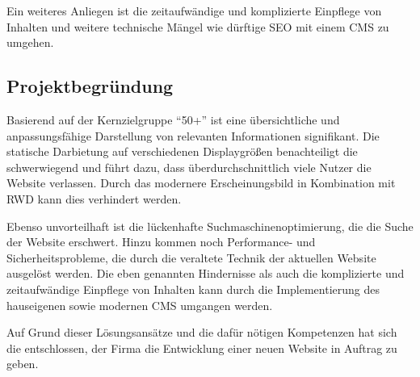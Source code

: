 Ein weiteres Anliegen ist die zeitaufwändige und komplizierte Einpflege von
Inhalten und weitere technische Mängel wie \zB dürftige \ac{SEO} mit einem
\ac{CMS} zu umgehen.


\subsection{Projektbegründung} 
\label{sec:Projektbegruendung}
Basierend auf der Kernzielgruppe "`50+"' ist eine übersichtliche und
anpassungsfähige Darstellung von relevanten Informationen signifikant. 
Die statische Darbietung auf verschiedenen Displaygrößen benachteiligt die
 schwerwiegend und führt dazu, dass
überdurchschnittlich viele Nutzer die Website verlassen. Durch das modernere
Erscheinungsbild in Kombination mit \ac{RWD} kann dies verhindert werden.
 
Ebenso unvorteilhaft ist die lückenhafte Suchmaschinenoptimierung, die die Suche
der Website erschwert. Hinzu kommen noch Performance- und
Sicherheitsprobleme, die durch die veraltete Technik der aktuellen Website
ausgelöst werden. Die eben genannten Hindernisse als auch die komplizierte und
zeitaufwändige Einpflege von Inhalten kann durch die Implementierung des
hauseigenen sowie modernen \ac{CMS} \ct umgangen werden.

Auf Grund dieser Lösungsansätze und die dafür nötigen Kompetenzen hat sich die
\kunde entschlossen, der Firma \mh die Entwicklung einer neuen Website in
Auftrag zu geben.
